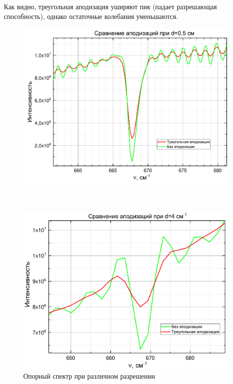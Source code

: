 Как видно, треугольная аподизация уширяют пик (падает разрешающая способность), однако остаточные колебания уменьшаются.

\begin{figure}[H]
	\centering
	\begin{minipage}[h!]{0.9\linewidth}
		\centering
		\includegraphics[width=1\linewidth]{data/apodiz_comparation_0_5}
	\end{minipage}\\
	\begin{minipage}[h!]{0.9\linewidth}
		\centering
		\includegraphics[width=1\linewidth]{data/apodiz_comparation_4}
	\end{minipage}
	\caption{Опорный спектр при различном разрешении}
	\label{apotis}
\end{figure}

